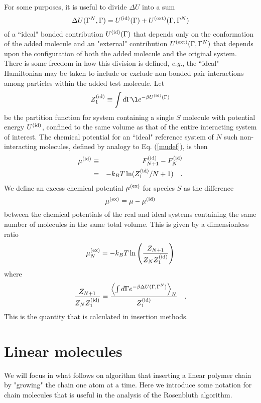 \documentclass[12pt]{article} %
\newcommand{\eg}{{\it e.g.}}
\newcommand\system{\Gamma^{N}}
\newcommand\chain{\Gamma}
\newcommand\delU{\Delta U}
\newcommand\Uid{U^{({\rm id})}}
\newcommand\Uext{U^{({\rm ext})}}
\newcommand\Ztot{Z_{N+1}}
\newcommand\Zsystem{Z_{N}}
\newcommand\Zid{Z^{({\rm id})}}
\newcommand\Fid{F^{({\rm id})}}
\newcommand\muid{\mu^{({\rm id})}}
\newcommand\muex{\mu^{({\rm ex})}}
\begin{document}
For some purposes, it is useful to divide $\delU$ into a sum
\begin{equation}
   \delU(\system, \chain) = \Uid(\chain) + \Uext (\chain, \system)
\end{equation}
of a ``ideal" bonded contribution $\Uid(\chain)$ that depends only on the conformation of the added molecule and an "external" contribution $\Uext(\chain,\system)$ that depends upon the configuration of both the added molecule and the original system.  There is some freedom in how this division is defined, \eg, the ``ideal" Hamiltonian may be taken to include or exclude non-bonded pair interactions among particles within the added test molecule. Let 
\begin{equation}
    \Zid_{1} \equiv \int d\chain \l e^{-\beta \Uid(\chain) }
\end{equation}
be the partition function for system containing a single $S$ molecule with potential energy $\Uid$, confined to the same volume as that of the entire interacting system of interest. The chemical potential for an ``ideal" reference system of $N$ such non-interacting molecules, defined by analogy to Eq. (\ref{mudef}), is then
\begin{eqnarray}
    \muid & \equiv & \Fid_{N+1} - \Fid_{N}  \nonumber \\
          & =      & -k_{B}T\ln(\Zid_{1}/N+1)
    \quad.
\end{eqnarray}
We define an excess chemical potential $\muex$ for species $S$ as the difference
\begin{equation}
     \muex \equiv \mu - \muid
\end{equation}
between the chemical potentials of the real and ideal systems containing the same number of molecules in the same total volume. This is given by a dimensionless ratio
\begin{equation}
   \muex_{N}  = -k_{B}T \ln \left ( \frac{\Ztot}{\Zsystem \Zid_{1}} \right )
\end{equation}
where
\begin{equation}
  \frac{\Ztot}{\Zsystem \Zid_{1}} = 
  \frac{\left \langle \int d\chain e^{-\beta \delU(\chain, \system)} \right \rangle_{N}} 
       {\Zid_{1}} 
  \quad.
\end{equation}
This is the quantity that is calculated in insertion methods.

\section{Linear molecules}
We will focus in what follows on algorithm that inserting a linear polymer chain 
by "growing" the chain one atom at a time. Here we introduce some notation for 
chain molecules that is useful in the analysis of the Rosenbluth algorithm.
\end{document}
